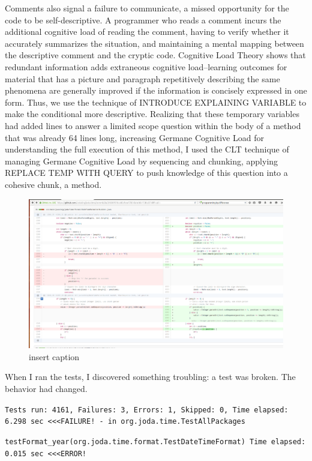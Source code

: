 Comments also signal a failure to communicate, a missed opportunity for the code to be self-descriptive. A programmer who reads a comment incurs the additional cognitive load of reading the comment, having to verify whether it accurately summarizes the situation, and maintaining a mental mapping between the descriptive comment and the cryptic code. Cognitive Load Theory shows that redundant information adds extraneous cognitive load--learning outcomes for material that has a picture and paragraph repetitively describing the same phenomena are generally improved if the information is concisely expressed in one form. Thus, we use the technique of INTRODUCE EXPLAINING VARIABLE to make the conditional more descriptive. Realizing that these temporary variables had added lines to answer a limited scope question within the body of a method that was already 64 lines long, increasing Germane Cognitive Load for understanding the full execution of this method, I used the CLT technique of managing Germane Cognitive Load by sequencing and chunking, applying REPLACE TEMP WITH QUERY to push knowledge of this question into a cohesive chunk, a method.

\begin{figure}[H]
	\centering
	\includegraphics[width=\linewidth]{code1}
	\caption{insert caption}
\end{figure}

When I ran the tests, I discovered something troubling: a test was broken. The behavior had changed.

\texttt{Tests run: 4161, Failures: 3, Errors: 1, Skipped: 0, Time elapsed: 6.298 sec \textless \textless \textless FAILURE! - in org.joda.time.TestAllPackages}

\texttt{testFormat\_year(org.joda.time.format.TestDateTimeFormat)  Time elapsed: 0.015 sec  \textless \textless \textless ERROR!}

